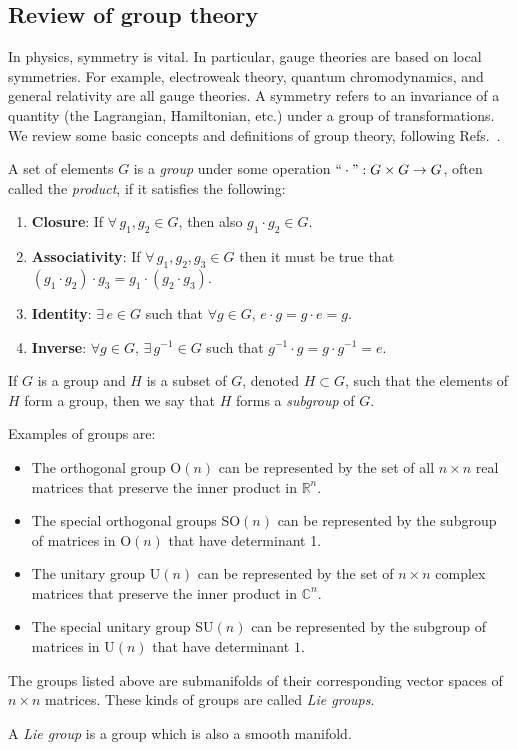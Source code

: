 \subsection{Review of group theory}\label{sec:revgroup}
In physics, symmetry is vital. In particular, gauge theories are based on local symmetries. For example, electroweak theory, quantum chromodynamics, and general relativity are all gauge theories. A symmetry refers to an in\-va\-ri\-ance of a quantity (the Lagrangian, Hamiltonian, etc.) under a group of trans\-for\-ma\-tions. We review some basic concepts and definitions of group theory, following Refs.\ \cite{Nakahara2003,Malek2018}.
\begin{definition}[Group]
A set of elements $G$ is a \textit{group} under some operation $``\cdot": G\times G \to G$, often called the \textit{product}, if it satisfies the following:
\begin{enumerate}
\item \textbf{Closure}: If $\forall\, g_1, g_2 \in G$, then also $g_1 \cdot g_2 \in G$.
\item \textbf{Associativity}: If $\forall\, g_1, g_2, g_3 \in G$ then it must be true that $(g_1\cdot g_2)\cdot g_3 = g_1\cdot (g_2\cdot g_3)$.
\item \textbf{Identity}: $\exists \, e \in G$ such that $\forall g \in G$, $e\cdot g = g \cdot e = g$.
\item \textbf{Inverse}: $\forall g \in G$, $\exists \,g^{-1} \in G$ such that $g^{-1}\cdot g = g \cdot g^{-1} = e$.
\end{enumerate}
\end{definition}

\begin{definition}[Subgroup]
If $G$ is a group and $H$ is a subset of $G$, denoted $H\subset G$, such that the elements of $H$ form a group, then we say that $H$ forms a \textit{subgroup }of $G$.
\end{definition}

Examples of groups are:
\begin{itemize}
 \item The orthogonal group O$(n)$ can be represented by the set of all $n\times n$ real matrices that preserve the inner product in $\mathbb{R}^n$.
\item The special orthogonal groups SO$(n)$ can be represented by the subgroup of matrices in O$(n)$ that have determinant 1.
\item The unitary group U$(n)$ can be represented by the set of $n\times n$ complex matrices that preserve the inner product in $\mathbb{C}^n$.
\item The special unitary group SU$(n)$ can be represented by the subgroup of matrices in U$(n)$ that have determinant $1$. 
\end{itemize} 
The groups listed above are submanifolds of their corresponding vector spaces of $n\times n$ matrices. These kinds of groups are called \textit{Lie groups}.
\begin{definition}
A \textit{Lie group} is a group which is also a smooth manifold.
\end{definition} 

